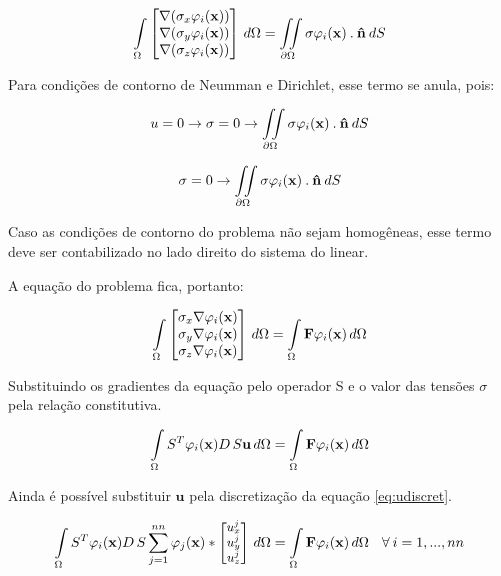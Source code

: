 \begin{equation}
\int\limits_{\Omega} 
\begin{bmatrix}
\nabla (\sigma_x \varphi_i(\mathbf{x}))\\ \nabla (\sigma_y \varphi_i(\mathbf{x})) \\ \nabla (\sigma_z \varphi_i(\mathbf{x}))
\end{bmatrix}
 \, d\Omega
=
\iint\limits_{\partial \Omega} \sigma \varphi_i(\mathbf{x}) \: . \: \mathbf{\hat{n}} \: dS
\end{equation}

Para condições de contorno de Neumman e Dirichlet, esse termo se anula, pois:

\begin{equation*}
    u = 0 \rightarrow \sigma = 0 \rightarrow \iint\limits_{\partial \Omega} \sigma \varphi_i(\mathbf{x}) \: . \: \mathbf{\hat{n}} \: dS
\end{equation*}

\begin{equation*}
     \sigma = 0 \rightarrow \iint\limits_{\partial \Omega} \sigma \varphi_i(\mathbf{x}) \: . \: \mathbf{\hat{n}} \: dS
\end{equation*}

Caso as condições de contorno do problema não sejam homogêneas, esse termo deve ser contabilizado no lado direito do sistema do linear.

A equação do problema fica, portanto:

\begin{equation}
\int\limits_{\Omega} 
\begin{bmatrix}
 \sigma_x \nabla \varphi_i(\mathbf{x})\\  \sigma_y \nabla \varphi_i(\mathbf{x}) \\  \sigma_z \nabla \varphi_i(\mathbf{x})
\end{bmatrix} \, d\Omega
= \int\limits_{\Omega} \mathbf{F}\varphi_i(\mathbf{x}) \, d\Omega
\end{equation}


Substituindo os gradientes da equação pelo operador S e o valor das tensões $\sigma$ pela relação constitutiva.

\begin{equation}
\int\limits_{\Omega} S^T \varphi_i(\mathbf{x}) D\,S\mathbf{u}  \, d\Omega
= \int\limits_{\Omega} \mathbf{F}\varphi_i(\mathbf{x}) \, d\Omega
\end{equation}

Ainda é possível substituir $\mathbf{u}$ pela discretização da equação \ref{eq:udiscret}.

\begin{equation}\small
\int\limits_{\Omega} S^T \varphi_i(\mathbf{x}) D\,S \sum_{j=1}^{nn}  \varphi_j(\mathbf{x})
 * \begin{bmatrix} u^j_x \\ u^j_y \\ u^j_z \end{bmatrix}
 \, d\Omega   =  \int\limits_{\Omega} \mathbf{F}\varphi_i(\mathbf{x}) \, d\Omega \quad \forall \: i=1,...,nn
\end{equation}


